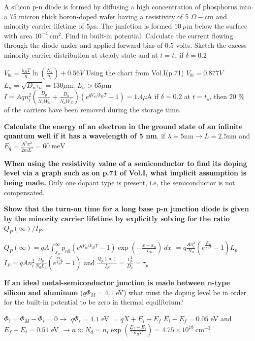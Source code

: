 \begin{multicols}{3}
A silicon p-n diode is formed by diffusing a high concentration of phosphorus into a 75 micron thick boron-doped wafer having a resistivity of 5 $\Omega-\text{cm}$ and minority carrier lifetime of $5 \mu$s. The junfction is formed $10 \ \mu$m below the surface with area $10^{-4} \ \text{cm}^2$. Find in built-in potential. Calculate the current flowing through the diode under and applied forward bias of 0.5 volts. Sketch the excess minority carrier distribution at steady state and at $t=t_s$ if $\delta=0.2$

$V_{bi}=\frac{k_BT}{q} \ln \left(\frac{N_a}{n_i}\right)+0.56 V$
Using the chart from Vol.I(p.71) $V_{bi}=0.877 V $ \hfill \linebreak
$L_n=\sqrt{D_n \tau_n} = 130 \mu \text{m}$, $L_n >65 \mu \text{m} $ $I=Aqn_i^2 \left(\frac{D_p}{N_dW_0^\prime}+\frac{D_n}{N_aW_E^\prime} \right) (e^{qV_a/k_BT}-1)=1.4 \mu \text{A}$ if $\delta = 0.2 $ at $t=t_s $, then 20 \% of the carriers have been removed during the storage time. \hfill \linebreak

\textbf{Calculate the energy of an electron in the ground state of an infinite quantum well if it has a wavelength of 5 nm}.
if $\lambda=5 \text{nm} \rightarrow L=2.5 \text{nm}$ and $E_q=\frac{\hbar^2 \pi^2}{2mL^2} = 60 \ \text{meV}$ \hfill \break

\textbf{When using the resistivity value of a semiconductor to find its doping level via a graph such as on p.71 of Vol.I, what implicit assumption is being made.}
Only one dopant type is present, i.e, the semiconductor is not compensated. \hfill \break

\textbf{Show that the turn-on time for a long base p-n junction diode is given by the minority carrier lifetime by explicitly solving for the ratio} $Q_P(\infty)/I_F$.

$Q_P(\infty)= qA \int_{x_n}^{\infty}p_{n0} \left(e^{qV_a/k_BT} -1 \right) \exp \left(- \frac{x-x_n}{L_p}\right) \ dx$
$=q\frac{An_i^2}{N_d} \left( e^{\frac{qV_{bi}}{k_BT}}-1 \right)L_p$
$I_F=qAn_i^2\frac{D_p}{N_dL_p} \left(e^{\frac{qV_{bi}}{k_BT}}-1 \right)$ and $\frac{Q_p(\infty)}{I_F}=\frac{L_p^2}{D_p}=\tau_p$ \hfill \break

\textbf{If an ideal metal-semiconductor junction is made between n-type silicon and aluminum} ($q\Phi_M=4.1$ eV) what must the doping level be in order for the built-in potential to be zero in thermal equilibrium?

$\Phi_i=\Phi_M-\Phi_s=0 \rightarrow$ $q\Phi_s=4.1$ eV $=qX+E_i-E_f$
$E_i-E_f=0.05$ eV and $E_f-E_i=0.51$ eV $\rightarrow n \approx N_d=n_i \exp \left(\frac{E_f-E_i}{k_BT} \right)=4.75 \times 10^{18} \ \text{cm}^{-3}$ \hfill \break 


\end{multicols}
